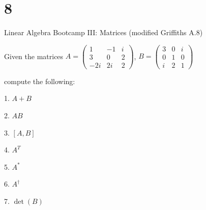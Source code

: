 \documentclass{article}
\begin{document}
\hfil

\section*{8}
\begin{ques}
Linear Algebra Bootcamp III: Matrices (modified Griffiths A.8)

Given the matrices  
$A = \begin{pmatrix} 1 & -1 & i \\ 3 & 0 & 2 \\ -2i & 2i & 2 \end{pmatrix}$,  
$B = \begin{pmatrix} 3 & 0 & i \\ 0 & 1 & 0 \\ i & 2 & 1 \end{pmatrix}$

compute the following:

1. $A + B$

2. $AB$

3. $[A,B]$

4. $A^T$

5. $A^\ast$

6. $A^\dagger$

7. $\det(B)$
\end{ques}
\end{document}
